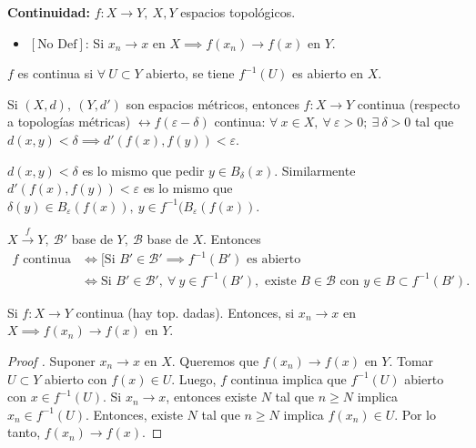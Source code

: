 \documentclass[a4paper]{report}
\begin{document}
	\noindent \textbf{Continuidad: } $f: X \to Y,\ X,Y$ espacios topológicos.
	\begin{itemize}
		\item $[\text{No Def}]$: Si $x_n \to x$ en $X \implies f(x_n) \to f(x)$ en $Y$.
	\end{itemize}
	\begin{definition}[continuidad]
		$f$ es continua si $\forall \ U \subset Y$ abierto, se tiene $f^{-1} (U)$ es abierto en $X$.
	\end{definition}

	\begin{eg}
		Si $(X,d),\ (Y,d')$ son espacios métricos, entonces $f:X \to Y$ continua (respecto a topologías métricas) $\longleftrightarrow f(\varepsilon - \delta)$ continua: $\forall\ x \in X,\ \forall \ \varepsilon > 0;\ \exists \ \delta > 0$ tal que $d(x,y) < \delta \implies d'(f(x),f(y)) < \varepsilon$.
	\end{eg}
	\begin{remark}
		$d(x,y)<\delta$ es lo mismo que pedir $y \in B_{\delta}(x)$. Similarmente $d'(f(x),f(y))<\varepsilon$ es lo mismo que $\delta (y) \in B_{\varepsilon}(f(x)), \ y \in f^{-1}(B_{\varepsilon}(f(x))$.
	\end{remark}

	\begin{lemma}
		$X \xrightarrow{f} Y,\ \mathcal{B}'$ base de $Y, \ \mathcal{B}$ base de $X$. Entonces
		\begin{align*}
			f \text{ continua} & \iff [\text{Si } B' \in \mathcal{B}' \implies f^{-1}(B') \text{ es abierto} \\
			& \iff \text{Si } B' \in \mathcal{B}',\ \forall\ y \in f^{-1}(B'), \text{ existe } B \in \mathcal{B} \text{ con } y \in B \subset f^{-1}(B')
		.\end{align*}
	\end{lemma}

	\begin{lemma}
		Si $f: X \to Y$ continua (hay top. dadas). Entonces, si $x_n \to x$ en $X \implies f(x_n) \to f(x)$ en $Y$.
	\end{lemma}
	\begin{proof}[Proof ]
		Suponer $x_n \to x$ en $X$. Queremos que $f(x_n) \to f(x)$ en $Y$. Tomar $U \subset Y$ abierto con $f(x) \in U$. Luego, $f$ continua implica que $f^{-1}(U)$ abierto con $x \in f^{-1}(U)$. Si $x_n \to x$, entonces existe $N$ tal que $n\geq N$ implica $x_n \in f^{-1}(U)$. Entonces, existe $N$ tal que $n\geq N$ implica $f(x_n) \in U$. Por lo tanto, $f(x_n) \to f(x)$.
	\end{proof}
	
\end{document}
